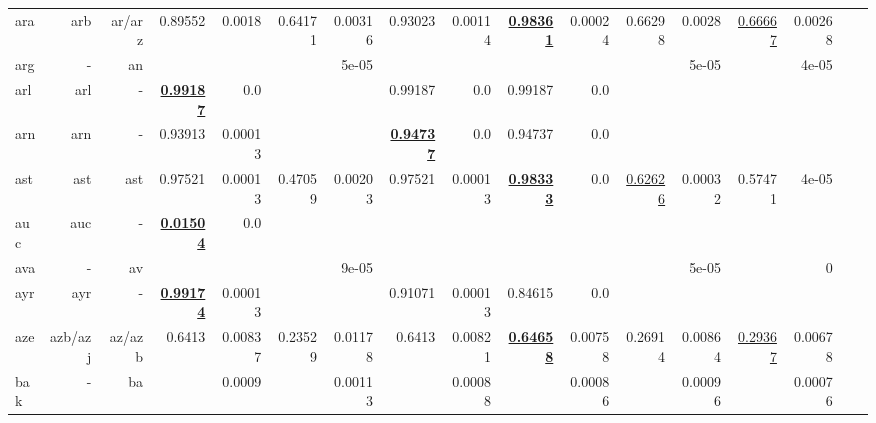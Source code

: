 \documentclass[11pt]{article}
\begin{document}
\begin{table*}[h]
{\begin{tabular}{lrrrrrrrrrrrrrrrr}
ara         & arb         & ar/arz         & 0.89552         & 0.0018         & 0.64171         & 0.00316         & 0.93023         & 0.00114         & \textbf{\underline{0.98361}}         & 0.00024         & 0.66298         & 0.0028         & \underline{0.66667}         & 0.00268         \\
arg         & -         & an         &          &          &          & 5e-05         &          &          &          &          &          & 5e-05         &          & 4e-05         \\
arl         & arl         & -         & \textbf{\underline{0.99187}}         & 0.0         &          &          & 0.99187         & 0.0         & 0.99187         & 0.0         &          &          &          &          \\
arn         & arn         & -         & 0.93913         & 0.00013         &          &          & \textbf{\underline{0.94737}}         & 0.0         & 0.94737         & 0.0         &          &          &          &          \\
ast         & ast         & ast         & 0.97521         & 0.00013         & 0.47059         & 0.00203         & 0.97521         & 0.00013         & \textbf{\underline{0.98333}}         & 0.0         & \underline{0.62626}         & 0.00032         & 0.57471         & 4e-05         \\
auc         & auc         & -         & \textbf{\underline{0.01504}}         & 0.0         &          &          &          &          &          &          &          &          &          &          \\
ava         & -         & av         &          &          &          & 9e-05         &          &          &          &          &          & 5e-05         &          & 0         \\
ayr         & ayr         & -         & \textbf{\underline{0.99174}}         & 0.00013         &          &          & 0.91071         & 0.00013         & 0.84615         & 0.0         &          &          &          &          \\
aze         & azb/azj         & az/azb         & 0.6413         & 0.00837         & 0.23529         & 0.01178         & 0.6413         & 0.00821         & \textbf{\underline{0.64658}}         & 0.00758         & 0.26914         & 0.00864         & \underline{0.29367}         & 0.00678         \\
bak         & -         & ba         &          & 0.0009         &          & 0.00113         &          & 0.00088         &          & 0.00086         &          & 0.00096         &          & 0.00076         \\

\end{tabular}}
\end{table*}
\end{document}
